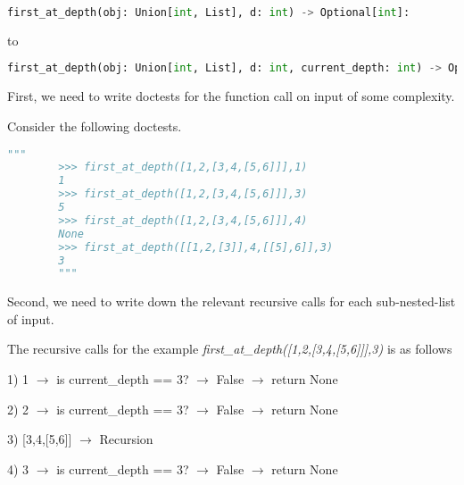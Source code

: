 \documentclass[12pt]{article}
\begin{document}
\begin{enumerate}[a.]
\begin{mdframed}
\begin{enumerate}[1.]
\begin{mdframed}
            \begin{lstlisting}[language=python,keepspaces=false]
            first_at_depth(obj: Union[int, List], d: int) -> Optional[int]:
            \end{lstlisting}

            to

            \begin{lstlisting}[language=python,keepspaces=false]
            first_at_depth(obj: Union[int, List], d: int, current_depth: int) -> Optional[int]:
            \end{lstlisting}

            \end{mdframed}
        \end{enumerate}

        \bigskip

        \begin{mdframed}
        First, we need to write doctests for the function call on input of some complexity.

        \bigskip

        Consider the following doctests.

        \begin{lstlisting}[language=python]
        """
        >>> first_at_depth([1,2,[3,4,[5,6]]],1)
        1
        >>> first_at_depth([1,2,[3,4,[5,6]]],3)
        5
        >>> first_at_depth([1,2,[3,4,[5,6]]],4)
        None
        >>> first_at_depth([[1,2,[3]],4,[[5],6]],3)
        3
        """
        \end{lstlisting}

        \bigskip

        Second, we need to write down the relevant recursive calls for each sub-nested-list of input.

        \bigskip

        The recursive calls for the example \textit{first\_at\_depth([1,2,[3,4,[5,6]]],3)}
        is as follows

        \begin{mdframed}

            1) 1 $\to$ is current\_depth == 3? $\to$ False $\to$ return None

            2) 2 $\to$ is current\_depth == 3? $\to$ False $\to$ return None

            3) [3,4,[5,6]] $\to$ Recursion

            \bigskip

            \hspace{10mm} 4) 3 $\to$ is current\_depth == 3? $\to$ False $\to$ return None


\end{mdframed}
\end{mdframed}
\end{mdframed}
\end{enumerate}
\end{document}
